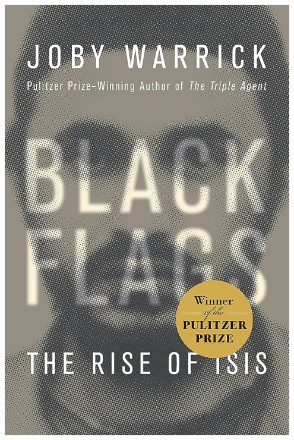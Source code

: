 \documentclass[aspectratio=43]{beamer}
\begin{document}
\begin{frame}
\begin{minipage}{0.45\textwidth}
\includegraphics[width = 0.95\textwidth]{img/blackflags}
\end{minipage}

\end{frame}
\end{document}
